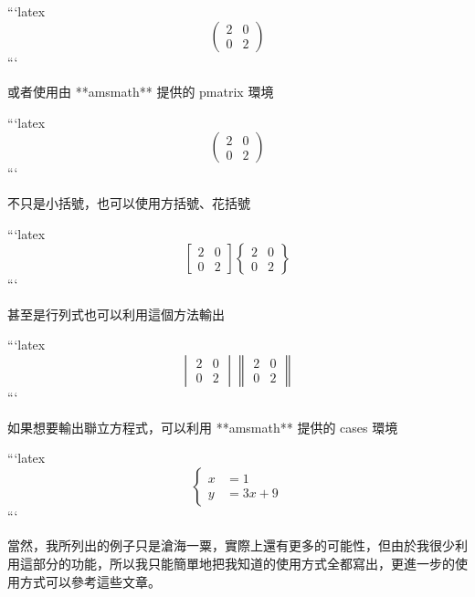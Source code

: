 \begin{markdown}
```latex
\[
\left(\begin{matrix}
2 & 0\\
0 & 2
\end{matrix}\right)
\]
```

或者使用由 **amsmath** 提供的 pmatrix 環境

```latex
\[
\begin{pmatrix}
2 & 0\\
0 & 2
\end{pmatrix}
\]
```

不只是小括號，也可以使用方括號、花括號

```latex
\[
\begin{bmatrix}
2 & 0\\
0 & 2
\end{bmatrix}
\begin{Bmatrix}
2 & 0\\
0 & 2
\end{Bmatrix}
\]
```

甚至是行列式也可以利用這個方法輸出

```latex
\[
\begin{vmatrix}
2 & 0\\
0 & 2
\end{vmatrix}
\begin{Vmatrix}
2 & 0\\
0 & 2
\end{Vmatrix}
\]
```

如果想要輸出聯立方程式，可以利用 **amsmath** 提供的 cases 環境

```latex
\[
\begin{cases}
x &= 1\\
y &= 3x + 9
\end{cases}
\]
```

當然，我所列出的例子只是滄海一粟，實際上還有更多的可能性，但由於我很少利用這部分的功能，所以我只能簡單地把我知道的使用方式全都寫出，更進一步的使用方式可以參考這些文章。

\end{markdown}